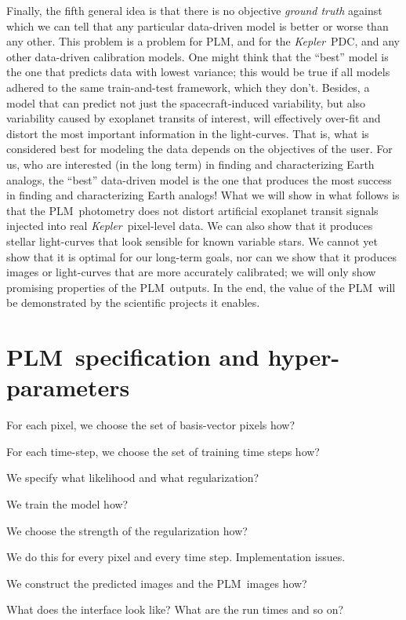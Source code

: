 \documentclass[12pt, preprint]{aastex}
\newcommand{\project}[1]{\textsl{#1}}
\newcommand{\Kepler}{\project{Kepler}}
\newcommand{\name}{PLM}
\begin{document}
Finally, the fifth general idea is that there is no objective \emph{ground truth} against which we can tell
  that any particular data-driven model is better or worse than any other.
This problem is a problem for \name, and for the \Kepler\ PDC, and any other data-driven calibration models.
One might think that the ``best'' model is the one that predicts data with lowest variance;
  this would be true if all models adhered to the same train-and-test framework, which they don't.
Besides, a model that can predict not just the spacecraft-induced variability,
  but also variability caused by exoplanet transits of interest,
  will effectively over-fit and distort the most important information in the light-curves.
That is, what is considered best for modeling the data depends on the objectives of the user.
For us, who are interested (in the long term) in finding and characterizing Earth analogs,
  the ``best'' data-driven model is the one that produces the most success in finding and characterizing Earth analogs!
What we will show in what follows is that the \name\ photometry does not distort
  artificial exoplanet transit signals injected into real \Kepler\ pixel-level data.
We can also show that it produces stellar light-curves that look sensible for known variable stars.
We cannot yet show that it is optimal for our long-term goals,
  nor can we show that it produces images or light-curves that are more accurately calibrated;
  we will only show promising properties of the \name\ outputs.
In the end, the value of the \name\ will be demonstrated by the scientific projects it enables.

\section{\name\ specification and hyper-parameters}

For each pixel, we choose the set of basis-vector pixels how?

For each time-step, we choose the set of training time steps how?

We specify what likelihood and what regularization?

We train the model how?

We choose the strength of the regularization how?

We do this for every pixel and every time step.
Implementation issues.

We construct the predicted images and the \name\ images how?

What does the interface look like?  What are the run times and so on?
\end{document}
